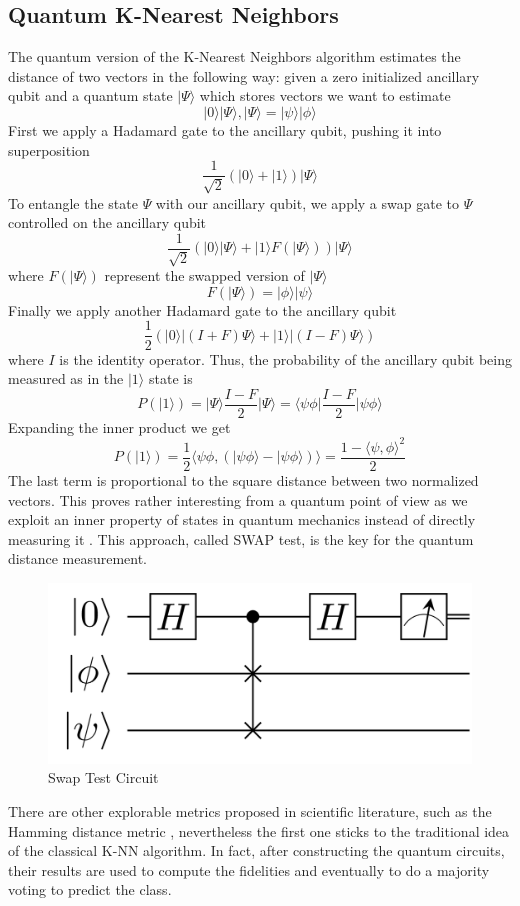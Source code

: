 \documentclass{article}
\begin{document}
\begin{multicols}{2}
\subsection{Quantum K-Nearest Neighbors}
The quantum version of the K-Nearest Neighbors algorithm estimates the distance of two vectors in the following way:
given a zero initialized ancillary qubit and a quantum state \(\lvert \Psi\rangle\) which stores vectors we want to estimate
$$ \lvert 0\rangle\lvert\Psi\rangle , \lvert \Psi\rangle = \lvert \psi \rangle\lvert \phi \rangle$$
First we apply a Hadamard gate to the ancillary qubit, pushing it into superposition
$$ \frac{1}{\sqrt{2}}(\lvert 0\rangle + \lvert 1\rangle)\lvert \Psi\rangle $$
To entangle the state \(\Psi\) with our ancillary qubit, we apply a swap gate to \(\Psi\) controlled on the ancillary qubit
$$ \frac{1}{\sqrt{2}}(\lvert 0\rangle \lvert \Psi\rangle + \lvert 1\rangle F(\lvert \Psi\rangle))\lvert \Psi\rangle $$
where \(F(\lvert \Psi\rangle)\) represent the swapped version of \(\lvert \Psi\rangle\)
$$F(\lvert \Psi\rangle) = \lvert \phi\rangle \lvert \psi\rangle $$
Finally we apply another Hadamard gate to the ancillary qubit
$$ \frac{1}{2}(\lvert 0\rangle \lvert (I + F)\Psi\rangle + \lvert 1\rangle \lvert(I - F)\Psi\rangle) $$
where $I$ is the identity operator.
Thus, the probability of the ancillary qubit being measured as in the \(\lvert 1\rangle\) state is 
$$ P(\lvert 1\rangle) = \lvert \Psi\rangle \frac{I-F}{2} \lvert \Psi\rangle = \langle \psi\phi\lvert \frac{I-F}{2} \lvert \psi\phi\rangle $$
Expanding the inner product we get
$$ P(\lvert 1\rangle) = \frac{1}{2}\langle \psi\phi, (\lvert \psi\phi\rangle - \lvert \psi\phi \rangle) \rangle  = \frac{1 - \langle \psi, \phi \rangle ^2}{2}$$
The last term is proportional to the square distance between two normalized vectors.
This proves rather interesting from a quantum point of view as we exploit an inner property of states in quantum mechanics instead of directly measuring it \cite{Basheer2020-ww}. This approach, called SWAP test, is the key for the quantum distance measurement.
\begin{figure}[H]
  \centering
    \includegraphics[width=.8\linewidth]{assets/Quantum-swap-test-circuit-correct.png}
    \caption{Swap Test Circuit}
\end{figure}
There are other explorable metrics proposed in scientific literature, such as the Hamming distance metric \cite{Li2021-le}, nevertheless the first one sticks to the traditional idea of the classical K-NN algorithm. In fact, after constructing the quantum circuits, their results are used to compute the fidelities and eventually to do a majority voting to predict the class. 


\end{multicols}
\end{document}
